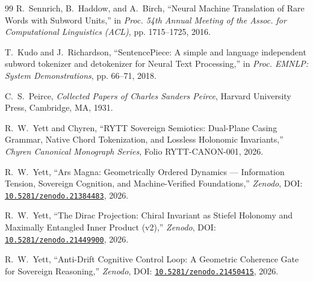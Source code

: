\documentclass[11pt,oneside,letterpaper]{article}
\theoremstyle{sovereignstyle}
\begin{document}
\begin{thebibliography}{99}
R.~Sennrich, B.~Haddow, and A.~Birch,
\newblock ``Neural Machine Translation of Rare Words with Subword Units,''
\newblock in \textit{Proc. 54th Annual Meeting of the Assoc. for Computational Linguistics (ACL)}, pp. 1715--1725, 2016.

T.~Kudo and J.~Richardson,
\newblock ``SentencePiece: A simple and language independent subword tokenizer and detokenizer for Neural Text Processing,''
\newblock in \textit{Proc. EMNLP: System Demonstrations}, pp. 66--71, 2018.

C.~S.~Peirce,
\newblock \textit{Collected Papers of Charles Sanders Peirce},
\newblock Harvard University Press, Cambridge, MA, 1931.

R.~W.~Yett and Chyren,
\newblock ``RYTT Sovereign Semiotics: Dual-Plane Casing Grammar, Native Chord Tokenization, and Lossless Holonomic Invariants,''
\newblock \textit{Chyren Canonical Monograph Series}, Folio RYTT-CANON-001, 2026.

R.~W.~Yett,
\newblock ``Ars Magna: Geometrically Ordered Dynamics --- Information Tension, Sovereign Cognition, and Machine-Verified Foundations,''
\newblock \textit{Zenodo}, DOI: \href{https://doi.org/10.5281/zenodo.21384483}{\texttt{10.5281/zenodo.21384483}}, 2026.

R.~W.~Yett,
\newblock ``The Dirac Projection: Chiral Invariant as Stiefel Holonomy and Maximally Entangled Inner Product (v2),''
\newblock \textit{Zenodo}, DOI: \href{https://doi.org/10.5281/zenodo.21449900}{\texttt{10.5281/zenodo.21449900}}, 2026.

R.~W.~Yett,
\newblock ``Anti-Drift Cognitive Control Loop: A Geometric Coherence Gate for Sovereign Reasoning,''
\newblock \textit{Zenodo}, DOI: \href{https://doi.org/10.5281/zenodo.21450415}{\texttt{10.5281/zenodo.21450415}}, 2026.
\end{thebibliography}
\end{document}
